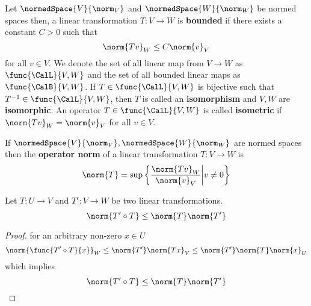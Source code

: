 \begin{definition}
    Let \(\normedSpace{V}{\norm_V}\) and \(\normedSpace{W}{\norm_W}\) be normed spaces then, a linear transformation \(T : V \to W\) is \textbf{bounded} if there exists a constant \(C > 0\) such that
    \begin{equation*}
        \norm{Tv}_W \leq C \norm{v}_V
    \end{equation*}
    for all \(v \in V\). We denote the set of all linear map from \(V \to W\) as \(\func{\CalL}{V,W}\) and the set of all bounded linear maps as \(\func{\CalB}{V,W}\). If \(T \in \func{\CalL}{V,W}\) is bijective such that \(T^{-1} \in \func{\CalL}{V,W}\), then \(T\) is called an \textbf{isomorphism} and \(V,W\) are \textbf{isomorphic}. An operator \(T \in \func{\CalL}{V,W}\) is called \textbf{isometric} if \(\norm{Tv}_W = \norm{v}_V\) for all \(v \in V\).
\end{definition}

\begin{definition}
    If \(\normedSpace{V}{\norm_V},\normedSpace{W}{\norm_W}\) are normed spaces then the \textbf{operator norm} of a linear transformation \(T : V \to W\) is
    \begin{equation*}
        \norm{T} = \sup \left\{\dfrac{\norm{Tv}_W}{\norm{v}_V} \middle| v \neq 0 \right\}
    \end{equation*}
\end{definition}

\begin{proposition}
    Let \(T : U \to V\) and \(T' : V \to W\) be two linear transformations.
    \begin{equation*}
        \norm{T' \circ T} \leq \norm{T} \norm{T'}
    \end{equation*}
\end{proposition}

\begin{proof}
    for an arbitrary non-zero \(x \in U\)
    \begin{equation*}
        \norm{\func{T' \circ T}{x}}_W \leq \norm{T'} \norm{Tx}_V \leq \norm{T'} \norm{T} \norm{x}_U
    \end{equation*}
    which implies
    \begin{equation*}
        \norm{T' \circ T} \leq \norm{T} \norm{T'}
    \end{equation*}
\end{proof}

